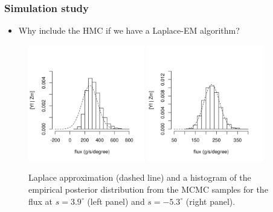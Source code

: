 \documentclass{beamer}
\begin{document}
\begin{frame}
\frametitle{Simulation study}
\begin{itemize}
\item Why include the HMC if we have a Laplace-EM algorithm?
\end{itemize}
\begin{center}
\vspace{-0.5cm}
\begin{figure}
\includegraphics[width=2in]{density_sim1.png}
\includegraphics[width=2in]{density_sim10.png}
	\caption{Laplace approximation (dashed line) and a histogram of the empirical posterior distribution from the MCMC samples for the flux at $s = 3.9^\circ$ (left panel) and $s = -5.3^\circ$ (right panel).}
\end{figure}
\end{center}
\end{frame}
\end{document}
